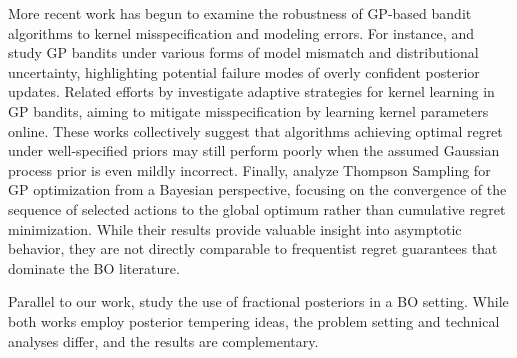 \documentclass[final,12pt]{colt2026} %
\begin{document}
More recent work has begun to examine the robustness of GP-based bandit algorithms to kernel misspecification and modeling errors. For instance, \citet{bogunovic2021misspecified} and \citet{kirschner2020distributionally} study GP bandits under various forms of model mismatch and distributional uncertainty, highlighting potential failure modes of overly confident posterior updates. Related efforts by \citet{calandriello2019gaussian} investigate adaptive strategies for kernel learning in GP bandits, aiming to mitigate misspecification by learning kernel parameters online. These works collectively suggest that algorithms achieving optimal regret under well-specified priors may still perform poorly when the assumed Gaussian process prior is even mildly incorrect. Finally, \citet{Kinjal2020} analyze Thompson Sampling for GP optimization from a Bayesian perspective, focusing on the convergence of the sequence of selected actions to the global optimum rather than cumulative regret minimization. While their results provide valuable insight into asymptotic behavior, they are not directly comparable to frequentist regret guarantees that dominate the BO literature.

Parallel to our work, \citet{li2026robustbayesianoptimizationtempered} study the use of fractional posteriors in a BO setting. While both works employ posterior tempering ideas, the problem setting and technical analyses differ, and the results are complementary.
\end{document}
